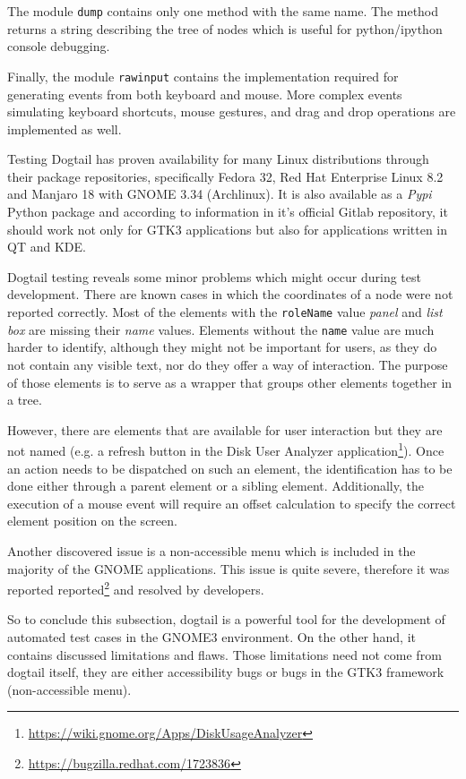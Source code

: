The module \texttt{dump} contains only one method with the same name. The method returns a string describing the tree of nodes which is useful for python/ipython console debugging.

Finally, the module \texttt{rawinput} contains the implementation required for generating events from both keyboard and mouse. More complex events simulating keyboard shortcuts, mouse gestures, and drag and drop operations are implemented as well.

Testing Dogtail has proven availability for many Linux distributions through their package repositories, specifically Fedora 32, Red Hat Enterprise Linux 8.2 and Manjaro 18 with GNOME 3.34 (Archlinux). It is also available as a \textit{Pypi} Python package and according to information in it's official Gitlab repository, it should work not only for GTK3 applications but also for applications written in QT and KDE. 
 
Dogtail testing reveals some minor problems which might occur during test development. There are known cases in which the coordinates of a node were not reported correctly. Most of the elements with the \texttt{roleName} value \textit{panel} and \textit{list box} are missing their \textit{name} values. Elements without the \texttt{name} value are much harder to identify, although they might not be important for users, as they do not contain any visible text, nor do they offer a way of interaction. The purpose of those elements is to serve as a wrapper that groups other elements together in a tree. 

However, there are elements that are available for user interaction but they are not named (e.g. a refresh button in the Disk User Analyzer application\footnote{\url{https://wiki.gnome.org/Apps/DiskUsageAnalyzer}}). 
Once an action needs to be dispatched on such an element, the identification has to be done either through a parent element or a sibling element. Additionally, the execution of a mouse event will require an offset calculation to specify the correct element position on the screen.

Another discovered issue is a non-accessible menu which is included in the majority of the GNOME applications. This issue is quite severe, therefore it was reported reported\footnote{\url{https://bugzilla.redhat.com/1723836}} and resolved by developers. 
 
 So to conclude this subsection, dogtail is a powerful tool for the development of automated test cases in the GNOME3 environment. On the other hand, it contains discussed limitations and flaws. Those limitations need not come from dogtail itself, they are either accessibility bugs or bugs in the GTK3 framework (non-accessible menu).  

